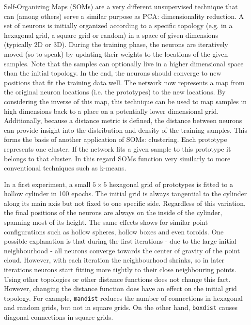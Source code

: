 \documentclass[a4, 10pt, twoside, twocolumn]{article}
\numberwithin{figure}{section}
\begin{document}
Self-Organizing Maps (SOMs) are a very different unsupervised technique that can (among others) serve a similar purpose as PCA: dimensionality reduction. A set of neurons is initially organized according to a specific topology (e.g. in a hexagonal grid, a square grid or random) in a space of given dimensions (typically 2D or 3D). During the training phase, the neurons are iteratively moved (so to speak) by updating their weights to the locations of the given samples. Note that the samples can optionally live in a higher dimensional space than the initial topology. In the end, the neurons should converge to new positions that fit the training data well. The network now represents a map from the original neuron locations (i.e. the prototypes) to the new locations. By considering the inverse of this map, this technique can be used to map samples in high dimensions back to a place on a potentially lower dimensional grid. Additionally, because a distance metric is defined, the distance between neurons can provide insight into the distribution and density of the training samples. This forms the basis of another application of SOMs: clustering. Each prototype represents one cluster. If the network fits a given sample to this prototype it belongs to that cluster. In this regard SOMs function very similarly to more conventional techniques such as k-means.

In a first experiment, a small $5 \times 5$ hexagonal grid of prototypes is fitted to a hollow cylinder in 100 epochs. The initial grid is always tangential to the cylinder along its main axis but not fixed to one specific side. Regardless of this variation, the final positions of the neurons are always on the inside of the cylinder, spanning most of its height. The same effects shows for similar point configurations such as hollow spheres, hollow boxes and even toroids. One possible explanation is that during the first iterations - due to the large initial neighbourhood - all neurons converge towards the center of gravity of the point cloud. However, with each iteration the neighbourhood shrinks, so in later iterations neurons start fitting more tightly to their close neighbouring points. Using other topologies or other distance functions does not change this fact. However, changing the distance function does have an effect on the initial grid topology. For example, \texttt{mandist} reduces the number of connections in hexagonal and random grids, but not in square grids. On the other hand, \texttt{boxdist} causes diagonal connections in square grids.
\end{document}
